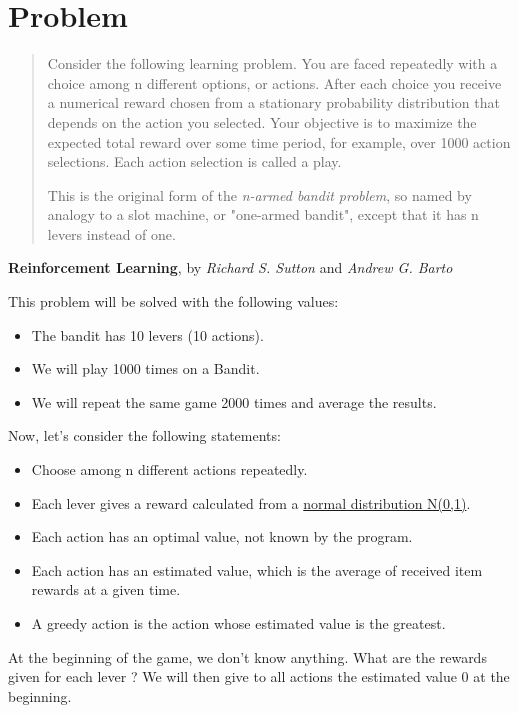 \documentclass[a4paper, twocolumn, 11pt, draft]{article}
\begin{document}
\section{Problem}

\begin{quotation}
Consider the following learning problem. You are faced repeatedly with a choice
among n different options, or actions. After each choice you receive a numerical
reward chosen from a stationary probability distribution that depends on the
action you selected. Your objective is to maximize the expected total reward over
some time period, for example, over 1000 action selections. Each action
selection is called a play.

This is the original form of the \textit{n-armed bandit problem}, so named by
analogy to a slot machine, or "one-armed bandit", except that it has n levers
instead of one.
\end{quotation}
\begin{flushright}
    \textbf{Reinforcement Learning}, by \textit{Richard S. Sutton} and
    \textit{Andrew G. Barto}
\end{flushright}


This problem will be solved with the following values:
\begin{itemize}
\item The bandit has 10 levers (10 actions).
\item We will play 1000 times on a Bandit.
\item We will repeat the same game 2000 times and average the results.
\end{itemize}

Now, let's consider the following statements:

\begin{itemize}
\item Choose among n different actions repeatedly.
\item Each lever gives a reward calculated from a
      \href{http://en.wikipedia.org/wiki/Normal_distribution}
      {normal distribution N(0,1)}.
\item Each action has an optimal value, not known by the program.
\item Each action has an estimated value, which is the average of received
      item rewards at a given time.
\item A greedy action is the action whose estimated value is the greatest.
\end{itemize}

At the beginning of the game, we don't know anything. What are the rewards given
for each lever ? We will then give to all actions the estimated value 0
at the beginning.
\end{document}
